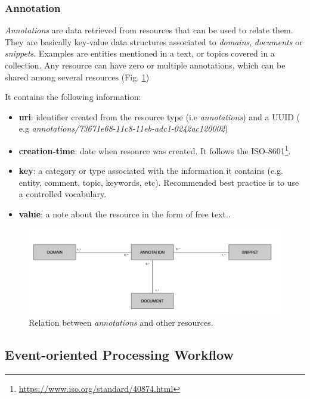 \subsubsection{Annotation}

\textit{Annotations} are data retrieved from resources that can be used to relate them. They are basically key-value data structures associated to \textit{domains}, \textit{documents} or \textit{snippets}. Examples are entities mentioned in a text, or topics covered in a collection. Any resource can have zero or multiple annotations, which can be shared among several resources (Fig. \ref{fig:librairy-model-annotation})

It contains the following information:
\begin{itemize}
\item \textbf{uri}: identifier created from the resource type (i.e \textit{annotations}) and a UUID ( e.g \textit{annotations/73671e68-11c8-11eb-adc1-0242ac120002})
\item \textbf{creation-time}: date when resource was created. It follows the ISO-8601\footnote{\url{https://www.iso.org/standard/40874.html}}.
\item \textbf{key}: a category or type associated with the information it contains (e.g. entity, comment, topic, keywords, etc). Recommended best practice is to use a controlled vocabulary.
\item \textbf{value}: a note about the resource in the form of free text..
\end{itemize}

\begin{figure}
  \center
  \includegraphics[scale=0.4]{model-annotation.png}
  \caption{Relation between \textit{annotations} and other resources.}
  \label{fig:librairy-model-annotation}
\end{figure}

\subsection{Event-oriented Processing Workflow}


